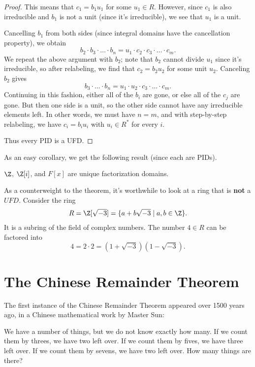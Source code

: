 \documentclass[math1530-lecture-notes]{subfiles}
\begin{document}
\begin{proof}[Proof]
  This means that $c_1=b_1u_1$ for some $u_1\in R$. However, since $c_1$ is also irreducible and
  $ b_1$ is not a unit (since it's irreducible), we see that $u_1$ is a unit.

  Cancelling $b_1$ from both sides (since integral domains have the cancellation property), we
  obtain \[
    b_2\cdot b_3\cdot \ldots\cdot b_n=u_1\cdot c_2\cdot c_3\cdot \ldots\cdot c_m
  .\] We repeat the above argument with $b_2$; note that $b_2$ cannot divide $u_1$ since it's
  irreducible, so after relabeling, we find that $c_2=b_2u_2$ for some unit $u_2$. Canceling $b_2$
  gives \[
    b_3\cdot \ldots\cdot b_n=u_1\cdot u_2\cdot c_3\cdot \ldots\cdot c_m
  .\] Continuing in this fashion, either all of the $b_i$ are gone, or else all of the $c_j$ are
  gone. But then one side is a unit, so the other side cannot have any irreducible elements left. In
  other words, we must have $n=m$, and with step-by-step relabeling, we have $c_i=b_iu_i$ with
  $u_i\in R^*$ for every $i$.

  Thus every PID is a UFD.
\end{proof}

As an easy corollary, we get the following result (since each are PIDs).
\begin{corollary}{}
  $\Z$, $\Z[i]$, and $F[x]$ are unique factorization domains.
\end{corollary}
\begin{example}
   As a counterweight to the theorem, it's worthwhile to look at a ring that is
  \textbf{not} a $UFD$. Consider the ring \[
    R=\Z[\sqrt{-3}]=\{a+b\sqrt{-3}\mid a,b\in \Z \} 
  .\] It is a subring of the field of complex numbers. The number $4\in R$ can be factored into \[
  4=2\cdot 2=(1+\sqrt{-3})(1-\sqrt{-3})
  .\] 
\end{example}

\section{The Chinese Remainder Theorem}
The first instance of the Chinese Remainder Theorem appeared over 1500 years ago, in a Chinese
mathematical work by Master Sun: \begin{center}
  We have a number of things, but we do not know exactly how many. If we count them by threes, we
  have two left over. If we count them by fives, we have three left over. If we count them by
  sevens, we have two left over. How many things are there?
\end{center}
\end{document}
